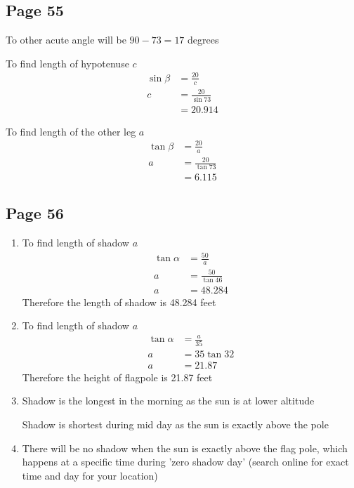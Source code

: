 \documentclass{article}
\newenvironment{solutions}[1]
{\subsection*{#1}
 \begin{enumerate}[leftmargin=1.5em]}
{\end{enumerate}}
\newcommand{\solution}{\item}
\begin{document}
\begin{solutions}{Page 55}
    To other acute angle will be $90-73 = 17$ degrees

    To find length of hypotenuse $c$
    \begin{align*}
        \sin \beta &= \frac{20}{c}\\
        c &= \frac{20}{\sin 73}\\
          &= 20.914
    \end{align*}

    To find length of the other leg $a$
    \begin{align*}
        \tan \beta &= \frac{20}{a}\\
        a &= \frac{20}{\tan 73}\\
          &= 6.115
    \end{align*}
\end{solutions}

\begin{solutions}{Page 56}
\solution

    To find length of shadow $a$
    \begin{align*}
        \tan \alpha &=\frac{50}{a}\\
        a &= \frac{50}{\tan 46}\\
        a &=  48.284
    \end{align*}
    Therefore the length of shadow is 48.284 feet

\solution

    To find length of shadow $a$
    \begin{align*}
        \tan \alpha &=\frac{a}{35}\\
        a &= 35\tan 32\\
        a &=  21.87
    \end{align*}
    Therefore the height of flagpole is 21.87 feet

\solution
Shadow is the longest in the morning as the sun is at lower altitude

Shadow is shortest during mid day as the sun is exactly above the pole

\solution
There will be no shadow when the sun is exactly above the flag pole, which happens at a specific time during 'zero shadow day' (search online for exact time and day for your location)
\end{solutions}
\end{document}
